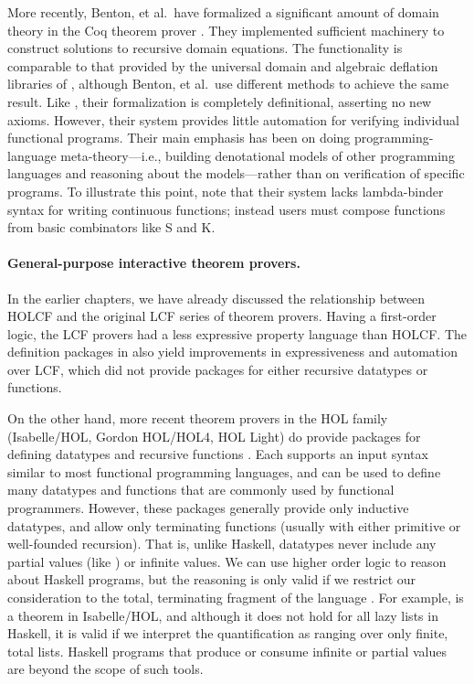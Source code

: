 More recently, Benton, et al.\ have formalized a significant amount of domain theory in the Coq theorem prover \cite{bkv2009coq}. They implemented sufficient machinery to construct solutions to recursive domain equations. The functionality is comparable to that provided by the universal domain and algebraic deflation libraries of , although Benton, et al.\ use different methods to achieve the same result. Like , their formalization is completely definitional, asserting no new axioms. However, their system provides little automation for verifying individual functional programs. Their main emphasis has been on doing programming-language meta-theory---i.e., building denotational models of other programming languages and reasoning about the models---rather than on verification of specific programs. To illustrate this point, note that their system lacks lambda-binder syntax  for writing continuous functions; instead users must compose functions from basic combinators like S and K.

\paragraph{General-purpose interactive theorem provers.}

In the earlier chapters, we have already discussed the relationship between HOLCF and the original LCF series of theorem provers. Having a first-order logic, the LCF provers had a less expressive property language than HOLCF. The definition packages in  also yield improvements in expressiveness and automation over LCF, which did not provide packages for either recursive datatypes or functions.

On the other hand, more recent theorem provers in the HOL family (Isabelle{\slash}HOL, Gordon HOL/HOL4, HOL Light) do provide packages for defining datatypes and recursive functions \cite{melham89automating,Slind96recdef,bw99inductivedatatypes}. Each supports an input syntax similar to most functional programming languages, and can be used to define many datatypes and functions that are commonly used by functional programmers. However, these packages generally provide only inductive datatypes, and allow only terminating functions (usually with either primitive or well-founded recursion). That is, unlike Haskell, datatypes never include any partial values (like ) or infinite values. We can use higher order logic to reason about Haskell programs, but the reasoning is only valid if we restrict our consideration to the total, terminating fragment of the language \cite{dghj06fastloose}. For example,  is a theorem in Isabelle/HOL, and although it does not hold for all lazy lists in Haskell, it is valid if we interpret the quantification as ranging over only finite, total lists. Haskell programs that produce or consume infinite or partial values are beyond the scope of such tools.

